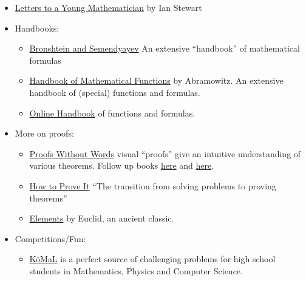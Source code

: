 \documentclass{article}
\begin{document}
\begin{itemize}
    \item \href{https://www.goodreads.com/book/show/537480.Letters_to_a_Young_Mathematician}{Letters to a Young Mathematician} by Ian Stewart
    
    \item Handbooks:
    \begin{itemize}

        \item \href{https://www.goodreads.com/book/show/1904487.Handbook_of_Mathematics}{Bronshtein and Semendyayev} An extensive ``handbook'' of mathematical formulas
    
        \item \href{https://www.goodreads.com/book/show/1296073.Handbook_of_Mathematical_Functions}{Handbook of Mathematical Functions} by Abramowitz. An extensive handbook of (special) functions and formulas.
    
        \item \href{https://dlmf.nist.gov/}{Online Handbook} of functions and formulas.
    \end{itemize}
    
    \item More on proofs:
    \begin{itemize}
        \item \href{https://www.goodreads.com/book/show/365666.Proofs_Without_Words}{Proofs Without Words} visual ``proofs'' give an intuitive understanding of various theorems. Follow up books \href{https://www.goodreads.com/book/show/365667.Proofs_Without_Words_II}{here} and \href{https://www.goodreads.com/book/show/9655655-charming-proofs}{here}.
    
        \item \href{https://www.goodreads.com/book/show/739735.How_to_Prove_It}{How to Prove It} ``The transition from solving problems to proving theorems''
    
        \item \href{http://farside.ph.utexas.edu/Books/Euclid/Elements.pdf}{Elements} by Euclid, an ancient classic.
    \end{itemize}
    
    \item Competitions/Fun:
    \begin{itemize}
        \item \href{https://www.komal.hu/home.e.shtml}{KöMaL} is a perfect source of challenging problems for high school students in Mathematics, Physics and Computer Science.
        

\end{itemize}
\end{itemize}
\end{document}
